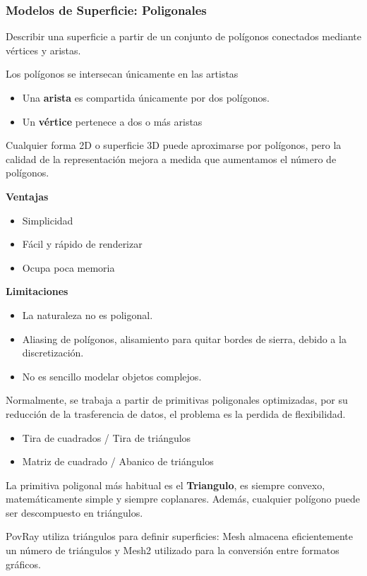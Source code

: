 \subsubsection{Modelos de Superficie: Poligonales}
Describir una superficie a partir de un conjunto de polígonos conectados mediante vértices y aristas.

Los polígonos se intersecan únicamente en las artistas
\begin{itemize}
	\item Una \textbf{arista} es compartida únicamente por dos polígonos.
	\item Un \textbf{vértice} pertenece a dos o más aristas
\end{itemize}

Cualquier forma 2D o superficie 3D puede aproximarse por polígonos, pero la calidad de la representación mejora a medida que aumentamos el número de polígonos.

\textbf{Ventajas}
\begin{itemize}
	\item Simplicidad
	\item Fácil y rápido de renderizar
	\item Ocupa poca memoria
\end{itemize}

\textbf{Limitaciones}
\begin{itemize}
	\item La naturaleza no es poligonal.
	\item Aliasing de polígonos, alisamiento para quitar bordes de sierra, debido a la discretización.
	\item No es sencillo modelar objetos complejos.
\end{itemize}

Normalmente, se trabaja a partir de primitivas poligonales optimizadas, por su reducción de la trasferencia de datos, el problema es la perdida de flexibilidad.
\begin{itemize}
	\item Tira de cuadrados / Tira de triángulos
	\item Matriz de cuadrado / Abanico de triángulos
\end{itemize}

La primitiva poligonal más habitual es el \textbf{Triangulo}, es siempre convexo, matemáticamente simple y siempre coplanares. Además, cualquier polígono puede ser descompuesto en triángulos.

PovRay utiliza triángulos para definir superficies: Mesh almacena eficientemente un número de triángulos y Mesh2 utilizado para la conversión entre formatos gráficos.


